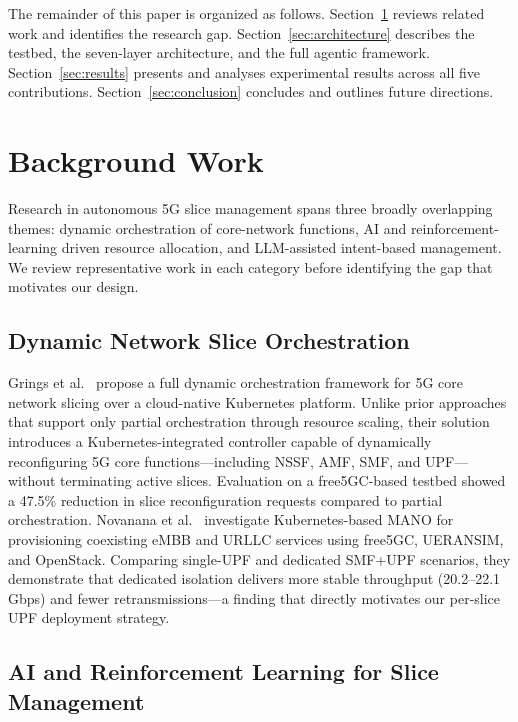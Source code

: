 \documentclass[12pt]{article}
\begin{document}
The remainder of this paper is organized as follows.
Section~\ref{sec:background} reviews related work and identifies the
research gap. Section~\ref{sec:architecture} describes the testbed, the
seven-layer architecture, and the full agentic framework.
Section~\ref{sec:results} presents and analyses experimental results
across all five contributions. Section~\ref{sec:conclusion} concludes
and outlines future directions.

\section{Background Work}
\label{sec:background}

Research in autonomous 5G slice management spans three broadly overlapping
themes: dynamic orchestration of core-network functions, AI and
reinforcement-learning driven resource allocation, and LLM-assisted
intent-based management. We review representative work in each category
before identifying the gap that motivates our design.

\subsection{Dynamic Network Slice Orchestration}

Grings et al.~\cite{grings2022dynamic} propose a full dynamic
orchestration framework for 5G core network slicing over a cloud-native
Kubernetes platform. Unlike prior approaches that support only partial
orchestration through resource scaling, their solution introduces a
Kubernetes-integrated controller capable of dynamically reconfiguring 5G
core functions---including NSSF, AMF, SMF, and UPF---without terminating
active slices. Evaluation on a free5GC-based testbed showed a 47.5\%
reduction in slice reconfiguration requests compared to partial
orchestration. Novanana et al.~\cite{novanana2024mano} investigate
Kubernetes-based MANO for provisioning coexisting eMBB and URLLC services
using free5GC, UERANSIM, and OpenStack. Comparing single-UPF and dedicated
SMF+UPF scenarios, they demonstrate that dedicated isolation delivers more
stable throughput (20.2--22.1\,Gbps) and fewer retransmissions---a
finding that directly motivates our per-slice UPF deployment strategy.

\subsection{AI and Reinforcement Learning for Slice Management}
\end{document}
